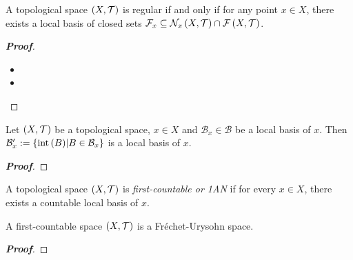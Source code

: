 \begin{proposition}
  A topological space $\left(X,\mathcal{T}\right)$ is regular if and only if for any point $x\in X$, there exists a local basis of closed sets $\mathcal{F}_x\subseteq\mathcal{N}_x\left(X,\mathcal{T}\right)\cap\mathcal{F}\left(X,\mathcal{T}\right)$.

  \begin{proof}[\rm\textbf{Proof}]
    \hfill
    \begin{itemize}
      \item[\boxed{\Rightarrow}] 
      \item[\boxed{\Leftarrow}] 
    \end{itemize}
  \end{proof}
\end{proposition}

\begin{proposition}
  Let $\left(X,\mathcal{T}\right)$ be a topological space, $x\in X$ and $\mathcal{B}_x\in\mathcal{B}$ be a local basis of $x$. Then $\mathcal{B}_x':=\left\{\operatorname{int}\left(B\right)\middle|B\in\mathcal{B}_x\right\}$ is a local basis of $x$.
  
  \begin{proof}[\rm\textbf{Proof}]
    
  \end{proof}
\end{proposition}

\begin{definition}
  A topological space $\left(X,\mathcal{T}\right)$ is \textit{first-countable or 1AN} if for every $x\in X$, there exists a countable local basis of $x$.
\end{definition}

\begin{proposition}
  A first-countable space $\left(X,\mathcal{T}\right)$ is a Fréchet-Urysohn space.

  \begin{proof}[\rm\textbf{Proof}]
    
  \end{proof}
\end{proposition}

